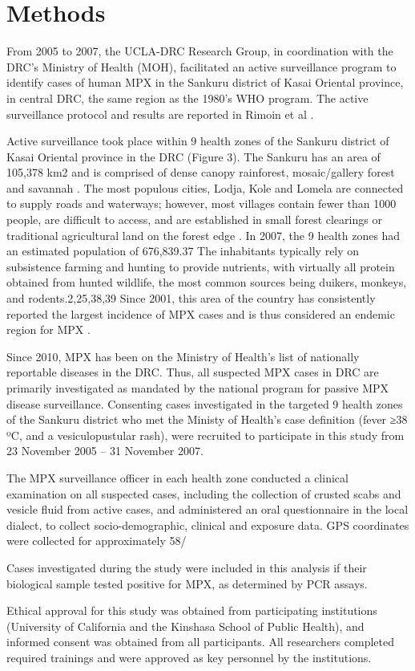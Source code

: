\section{Methods}

From 2005 to 2007, the UCLA-DRC Research Group, in coordination with the DRC’s Ministry of Health (MOH), facilitated an active surveillance program to identify cases of human MPX in the Sankuru district of Kasai Oriental province, in central DRC, the same region as the 1980’s WHO program. The active surveillance protocol and results are reported in Rimoin et al \cite{Rimoin2010}.

Active surveillance took place within 9 health zones of the Sankuru district of Kasai Oriental province in the DRC (Figure 3). The Sankuru has an area of 105,378 km2 and is comprised of dense canopy rainforest, mosaic/gallery forest and savannah \cite{Fuller2011}. The most populous cities, Lodja, Kole and Lomela are connected to supply roads and waterways; however, most villages contain fewer than 1000 people, are difficult to access, and are established in small forest clearings or traditional agricultural land on the forest edge \cite{Rimoin2010}. In 2007, the 9 health zones had an estimated population of 676,839.37 The inhabitants typically rely on subsistence farming and hunting to provide nutrients, with virtually all protein obtained from hunted wildlife, the most common sources being duikers, monkeys, and rodents.2,25,38,39 Since 2001, this area of the country has consistently reported the largest incidence of MPX cases and is thus considered an endemic region for MPX \cite{Rimoin2010}. 

Since 2010, MPX has been on the Ministry of Health's list of nationally reportable diseases in the DRC. Thus, all suspected MPX cases in DRC are primarily investigated as mandated by the national program for passive MPX disease surveillance. Consenting cases investigated in the targeted 9 health zones of the Sankuru district who met the  Ministy of Health’s case definition (fever ≥38 ºC, and a vesiculopustular rash), were recruited to participate in this study from 23 November 2005 – 31 November 2007. 

The MPX surveillance officer in each health zone conducted a clinical examination on all suspected cases, including the collection of crusted scabs and vesicle fluid from active cases, and administered an oral questionnaire in the local dialect, to collect socio-demographic, clinical and exposure data. GPS coordinates were collected for approximately 58/%

Cases investigated during the study were included in this analysis if their biological sample tested positive for MPX, as determined by PCR assays. 

Ethical approval for this study was obtained from participating institutions (University of California and the Kinshasa School of Public Health), and informed consent was obtained from all participants. All researchers completed required trainings and were approved as key personnel by the institutions. 




